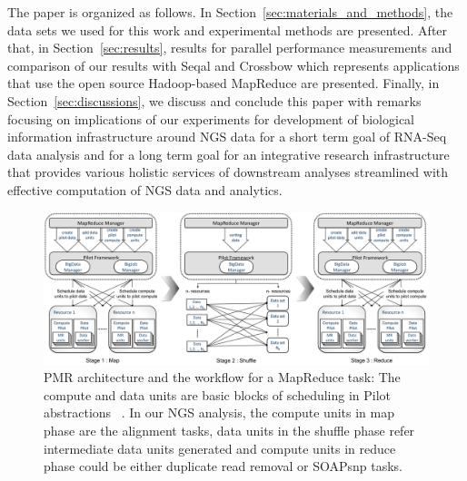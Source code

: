 \documentclass{acm_proc_article-sp}
\begin{document}

The paper is organized as follows. In
Section~\ref{sec:materials_and_methods}, the data sets we used for
this work and experimental methods are presented.
After that, in Section~\ref{sec:results}, results for parallel performance
measurements and comparison of our results with Seqal and Crossbow
which represents applications that use the open source Hadoop-based
MapReduce\cite{hadoop-url, taylor2010,seal_2011_mapred,seal2011} are
presented.  Finally, in Section~\ref{sec:discussions}, we 
discuss and conclude this paper with remarks focusing on
implications of our experiments for development of biological
information infrastructure around NGS data for a short term goal of
RNA-Seq data analysis and for a long term goal for an integrative
research infrastructure that provides various holistic services of
downstream analyses streamlined with effective computation of NGS data
and analytics.

\begin{center}
\hfill{}
\begin{figure}
 \centering
\includegraphics[scale=0.35]{figures/F1_1.pdf} 
\hfill{}
\caption{\small PMR architecture and the workflow for a MapReduce task: The compute and data units are basic blocks of scheduling in Pilot abstractions ~\cite{pstar11}. In our NGS analysis, the compute units in map phase are the alignment tasks, data units in the shuffle phase refer intermediate data units generated and compute units in reduce phase could be either duplicate read removal or SOAPsnp tasks.}
  \label{fig:arch-pj-saga-mr} 
\end{figure}
\end{center}
\end{document}
